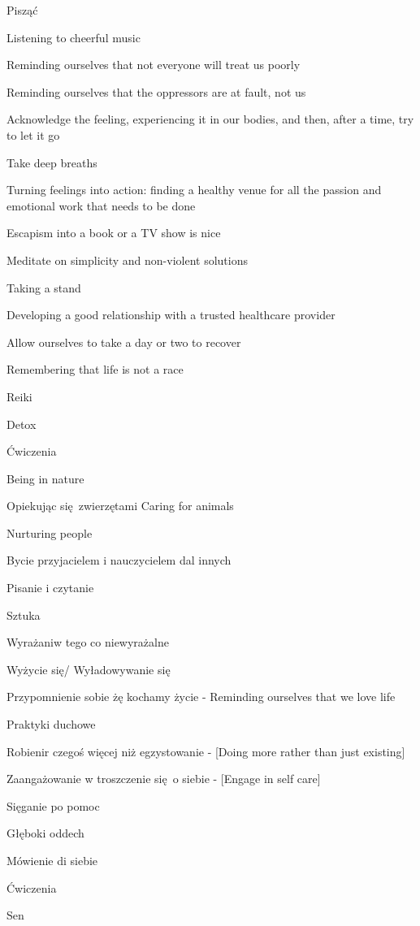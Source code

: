 \begin{multicols}{2}
\begin{checkboxlist}
\item Pisząć
\item Listening to cheerful music
\item Reminding ourselves that not everyone will treat us poorly
\item Reminding ourselves that the oppressors are at fault, not us
\item Acknowledge the feeling, experiencing it in our bodies, and then, after a time, try to let it go
\item Take deep breaths
\item Turning feelings into action: finding a healthy venue for all the passion and emotional work that needs to be done
\item Escapism into a book or a TV show is nice
\item Meditate on simplicity and non-violent solutions
\item Taking a stand
\item Developing a good relationship with a trusted healthcare provider
\item Allow ourselves to take a day or two to recover
\item Remembering that life is not a race
\item Reiki
\item Detox
\item Ćwiczenia
\item Being in nature
\item Opiekując się zwierzętami Caring for animals
\item Nurturing people
\item Bycie przyjacielem i nauczycielem dal innych
\item Pisanie i czytanie
\item Sztuka
\item Wyrażaniw tego co niewyrażalne
\item Wyżycie się/ Wyładowywanie się
\item Przypomnienie sobie żę kochamy życie - Reminding ourselves that we love life
\item Praktyki duchowe
\item Robienir czegoś więcej niż egzystowanie - [Doing more rather than just existing]
\item Zaangażowanie w troszczenie się o siebie - [Engage in self care]
\item Sięganie po pomoc
\item Głęboki oddech
\item Mówienie di siebie
\item Ćwiczenia
\item Sen
\end{checkboxlist}
\end{multicols}

